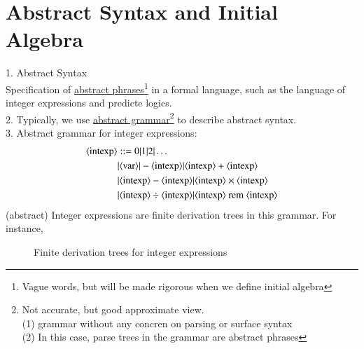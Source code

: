 \documentclass{article}[12pt]
\begin{document}
\section{Abstract Syntax and Initial Algebra}
1. Abstract Syntax \\
Specification of \underline{abstract phrases}\footnote{Vague words, but will be made rigorous when we define initial algebra} in a formal language, such as the language of integer expressions and predicte logics. \\
2. Typically, we use \underline{abstract grammar}\footnote{Not accurate, but good approximate view. \\(1) grammar without any concren on parsing or surface syntax \\(2) In this case, parse trees in the grammar are abstract phrases} to describe abstract syntax. \\
3. Abstract grammar for integer expressions: \\
\begin{align*}
    \langle \text{intexp}\rangle&::=0 | 1 | 2 | \ldots \\
    &| \langle \text{var}\rangle | -\langle \text{intexp}\rangle | \langle \text{intexp}\rangle + \langle \text{intexp}\rangle \\
    &| \langle \text{intexp}\rangle - \langle \text{intexp}\rangle | \langle \text{intexp}\rangle \times \langle \text{intexp}\rangle \\
    &| \langle \text{intexp}\rangle \div \langle \text{intexp}\rangle | \langle \text{intexp}\rangle \text{ rem } \langle \text{intexp}\rangle
\end{align*}
(abstract) Integer expressions are finite derivation trees in this grammar. For instance, \\
\begin{figure}
    \caption{Finite derivation trees for integer expressions}
\end{figure}
\end{document}
